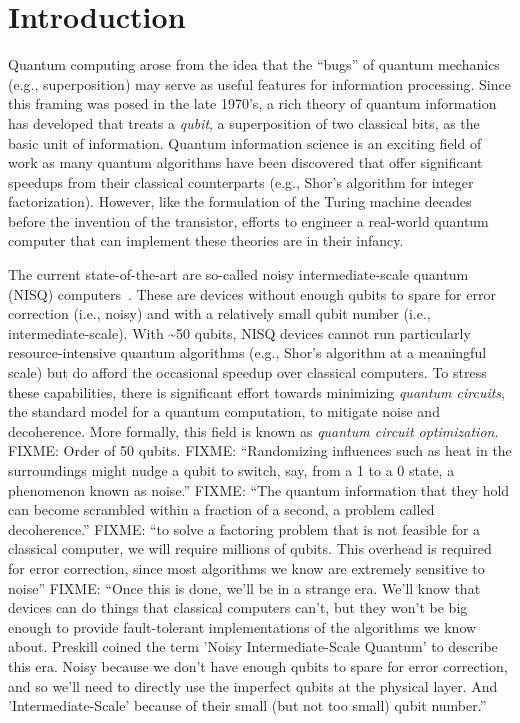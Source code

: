 \chapter[Introduction]{Introduction} \label{ch:intro}


Quantum computing arose from the idea that the ``bugs'' of quantum mechanics (e.g., superposition) may serve as useful features for information processing.
Since this framing was posed in the late 1970's, a rich theory of quantum information has developed that treats a \emph{qubit}, a superposition of two classical bits, as the basic unit of information.
Quantum information science is an exciting field of work as many quantum algorithms have been discovered that offer significant speedups from their classical counterparts (e.g., Shor's algorithm for integer factorization).
However, like the formulation of the Turing machine decades before the invention of the transistor, efforts to engineer a real-world quantum computer that can implement these theories are in their infancy.

The current state-of-the-art are so-called noisy intermediate-scale quantum (NISQ) computers~\cite{preskill2018quantum}.
These are devices without enough qubits to spare for error correction (i.e., noisy) and with a relatively small qubit number (i.e., intermediate-scale).
With \textasciitilde 50 qubits, NISQ devices cannot run particularly resource-intensive quantum algorithms (e.g., Shor's algorithm at a meaningful scale) but do afford the occasional speedup over classical computers.
To stress these capabilities, there is significant effort towards minimizing \emph{quantum circuits}, the standard model for a quantum computation, to mitigate noise and decoherence.
More formally, this field is known as \emph{quantum circuit optimization}.
\iffalse
FIXME: Order of 50 qubits.
FIXME: ``Randomizing influences such as heat in the surroundings might nudge a qubit to switch, say, from a 1 to a 0 state, a phenomenon known as noise.''
FIXME: ``The quantum information that they hold can become scrambled within a fraction of a second, a problem called decoherence.''
FIXME: ``to solve a factoring problem that is not feasible for a classical computer, we will require millions of qubits. This overhead is required for error correction, since most algorithms we know are extremely sensitive to noise''
FIXME: ``Once this is done, we'll be in a strange era. We'll know that devices can do things that classical computers can't, but they won't be big enough to provide fault-tolerant implementations of the algorithms we know about. Preskill coined the term 'Noisy Intermediate-Scale Quantum' to describe this era. Noisy because we don't have enough qubits to spare for error correction, and so we'll need to directly use the imperfect qubits at the physical layer. And 'Intermediate-Scale' because of their small (but not too small) qubit number.''

